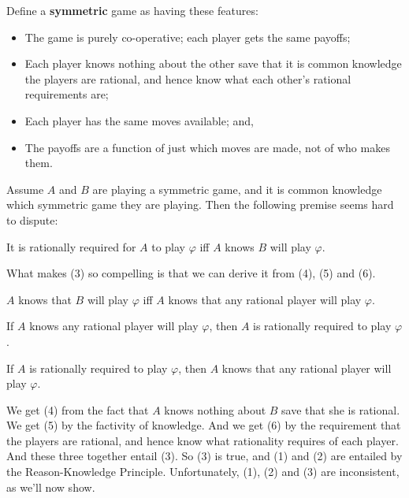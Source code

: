 \documentclass[
  11pt,
  letterpaper,
  DIV=11,
  numbers=noendperiod,
  twoside]{scrartcl}
\providecommand{\tightlist}{%
  \setlength{\itemsep}{0pt}\setlength{\parskip}{0pt}}
\begin{document}
Define a \textbf{symmetric} game as having these features:

\begin{itemize}
\tightlist
\item
  The game is purely co-operative; each player gets the same payoffs;
\item
  Each player knows nothing about the other save that it is common
  knowledge the players are rational, and hence know what each other's
  rational requirements are;
\item
  Each player has the same moves available; and,
\item
  The payoffs are a function of just which moves are made, not of who
  makes them.
\end{itemize}

Assume \(A\) and \(B\) are playing a symmetric game, and it is common
knowledge which symmetric game they are playing. Then the following
premise seems hard to dispute:

\begin{description}
\tightlist
\item[(3)]
It is rationally required for \(A\) to play \(\varphi\) iff \(A\) knows
\(B\) will play \(\varphi\).
\end{description}

What makes (3) so compelling is that we can derive it from (4), (5) and
(6).

\begin{description}
\tightlist
\item[(4)]
\(A\) knows that \(B\) will play \(\varphi\) iff \(A\) knows that any
rational player will play \(\varphi\).
\item[(5)]
If \(A\) knows any rational player will play \(\varphi\), then \(A\) is
rationally required to play \(\varphi\).
\item[(6)]
If \(A\) is rationally required to play \(\varphi\), then \(A\) knows
that any rational player will play \(\varphi\).
\end{description}

We get (4) from the fact that \(A\) knows nothing about \(B\) save that
she is rational. We get (5) by the factivity of knowledge. And we get
(6) by the requirement that the players are rational, and hence know
what rationality requires of each player. And these three together
entail (3). So (3) is true, and (1) and (2) are entailed by the
Reason-Knowledge Principle. Unfortunately, (1), (2) and (3) are
inconsistent, as we'll now show.
\end{document}
